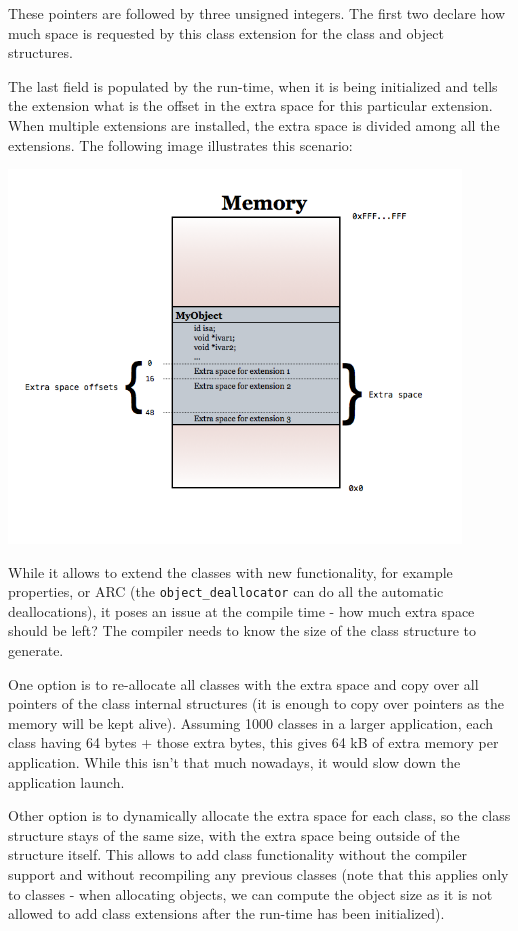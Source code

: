 These pointers are followed by three unsigned integers. The first two declare how much space is requested by this class extension for the class and object structures.

The last field is populated by the run-time, when it is being initialized and tells the extension what is the offset in the extra space for this particular extension. When multiple extensions are installed, the extra space is divided among all the extensions. The following image illustrates this scenario: \newline{}

\includegraphics[width=120mm]{img/class_extensions.png}

While it allows to extend the classes with new functionality, for example properties, or ARC (the \verb=object_deallocator= can do all the automatic deallocations), it poses an issue at the compile time - how much extra space should be left? The compiler needs to know the size of the class structure to generate.

One option is to re-allocate all classes with the extra space and copy over all pointers of the class internal structures (it is enough to copy over pointers as the memory will be kept alive). Assuming 1000 classes in a larger application, each class having 64 bytes + those extra bytes, this gives 64 kB of extra memory per application. While this isn't that much nowadays, it would slow down the application launch.

Other option is to dynamically allocate the extra space for each class, so the class structure stays of the same size, with the extra space being outside of the structure itself. This allows to add class functionality without the compiler support and without recompiling any previous classes (note that this applies only to classes - when allocating objects, we can compute the object size as it is not allowed to add class extensions after the run-time has been initialized).

